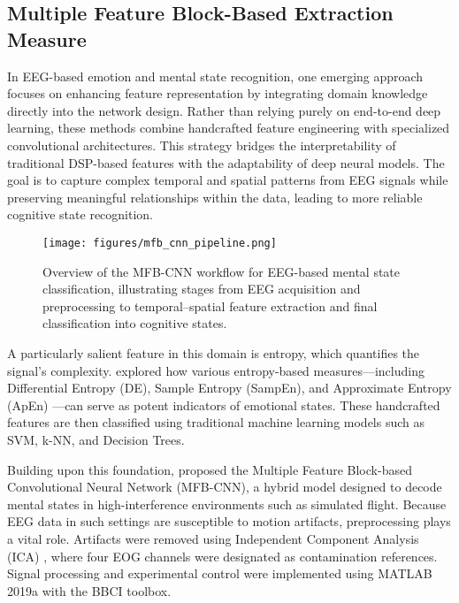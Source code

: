 \documentclass[conference]{IEEEtran}
\begin{document}
\subsection{Multiple Feature Block-Based Extraction Measure}
In EEG-based emotion and mental state recognition, one emerging approach focuses on enhancing feature representation by integrating domain knowledge directly into the network design. Rather than relying purely on end-to-end deep learning, these methods combine handcrafted feature engineering with specialized convolutional architectures. This strategy bridges the interpretability of traditional DSP-based features with the adaptability of deep neural models. The goal is to capture complex temporal and spatial patterns from EEG signals while preserving meaningful relationships within the data, leading to more reliable cognitive state recognition.

\begin{figure}[H]
    \centering
    \texttt{[image: figures/mfb\_cnn\_pipeline.png]}
    \caption{Overview of the MFB-CNN workflow for EEG-based mental state classification, illustrating stages from EEG acquisition and preprocessing to temporal–spatial feature extraction and final classification into cognitive states.}
    \label{fig:mfb_cnn_pipeline}
\end{figure}

A particularly salient feature in this domain is entropy, which quantifies the signal’s complexity. \cite{Patel2021EEGEntropyReview} explored how various entropy-based measures—including Differential Entropy (DE), Sample Entropy (SampEn), and Approximate Entropy (ApEn) \cite{Patel2021EEGEntropyReview}—can serve as potent indicators of emotional states. These handcrafted features are then classified using traditional machine learning models such as SVM, k-NN, and Decision Trees.

Building upon this foundation, \cite{Lee2020MFB_CNN_PilotMentalStates} proposed the Multiple Feature Block-based Convolutional Neural Network (MFB-CNN), a hybrid model designed to decode mental states in high-interference environments such as simulated flight. Because EEG data in such settings are susceptible to motion artifacts, preprocessing plays a vital role. Artifacts were removed using Independent Component Analysis (ICA) \cite{Lee2020MFB_CNN_PilotMentalStates}, where four EOG channels were designated as contamination references. Signal processing and experimental control were implemented using MATLAB 2019a with the BBCI toolbox.
\end{document}
